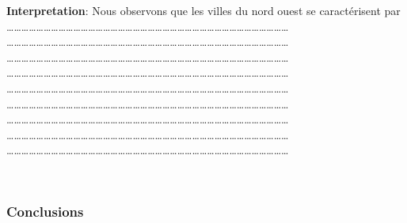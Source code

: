 \documentclass[
]{article}
\begin{document}
\textbf{Interpretation}: Nous observons que les villes du nord ouest se
caractérisent par\\
\ldots\ldots\ldots\ldots\ldots\ldots\ldots\ldots\ldots\ldots\ldots\ldots\ldots\ldots\ldots\ldots\ldots\ldots\ldots\ldots\ldots\ldots\ldots\ldots\ldots\ldots\ldots\ldots\ldots\ldots\ldots\ldots\ldots\ldots\ldots\ldots\ldots\ldots{}
\ldots\ldots\ldots\ldots\ldots\ldots\ldots\ldots\ldots\ldots\ldots\ldots\ldots\ldots\ldots\ldots\ldots\ldots\ldots\ldots\ldots\ldots\ldots\ldots\ldots\ldots\ldots\ldots\ldots\ldots\ldots\ldots\ldots\ldots\ldots\ldots\ldots\ldots{}
\ldots\ldots\ldots\ldots\ldots\ldots\ldots\ldots\ldots\ldots\ldots\ldots\ldots\ldots\ldots\ldots\ldots\ldots\ldots\ldots\ldots\ldots\ldots\ldots\ldots\ldots\ldots\ldots\ldots\ldots\ldots\ldots\ldots\ldots\ldots\ldots\ldots\ldots{}
\ldots\ldots\ldots\ldots\ldots\ldots\ldots\ldots\ldots\ldots\ldots\ldots\ldots\ldots\ldots\ldots\ldots\ldots\ldots\ldots\ldots\ldots\ldots\ldots\ldots\ldots\ldots\ldots\ldots\ldots\ldots\ldots\ldots\ldots\ldots\ldots\ldots\ldots{}
\ldots\ldots\ldots\ldots\ldots\ldots\ldots\ldots\ldots\ldots\ldots\ldots\ldots\ldots\ldots\ldots\ldots\ldots\ldots\ldots\ldots\ldots\ldots\ldots\ldots\ldots\ldots\ldots\ldots\ldots\ldots\ldots\ldots\ldots\ldots\ldots\ldots\ldots{}
\ldots\ldots\ldots\ldots\ldots\ldots\ldots\ldots\ldots\ldots\ldots\ldots\ldots\ldots\ldots\ldots\ldots\ldots\ldots\ldots\ldots\ldots\ldots\ldots\ldots\ldots\ldots\ldots\ldots\ldots\ldots\ldots\ldots\ldots\ldots\ldots\ldots\ldots{}
\ldots\ldots\ldots\ldots\ldots\ldots\ldots\ldots\ldots\ldots\ldots\ldots\ldots\ldots\ldots\ldots\ldots\ldots\ldots\ldots\ldots\ldots\ldots\ldots\ldots\ldots\ldots\ldots\ldots\ldots\ldots\ldots\ldots\ldots\ldots\ldots\ldots\ldots{}
\ldots\ldots\ldots\ldots\ldots\ldots\ldots\ldots\ldots\ldots\ldots\ldots\ldots\ldots\ldots\ldots\ldots\ldots\ldots\ldots\ldots\ldots\ldots\ldots\ldots\ldots\ldots\ldots\ldots\ldots\ldots\ldots\ldots\ldots\ldots\ldots\ldots\ldots{}
\ldots\ldots\ldots\ldots\ldots\ldots\ldots\ldots\ldots\ldots\ldots\ldots\ldots\ldots\ldots\ldots\ldots\ldots\ldots\ldots\ldots\ldots\ldots\ldots\ldots\ldots\ldots\ldots\ldots\ldots\ldots\ldots\ldots\ldots\ldots\ldots\ldots\ldots{}

~

\hypertarget{conclusions}{%
\subsubsection{\texorpdfstring{\textbf{Conclusions
}}{Conclusions }}\label{conclusions}}
\end{document}
